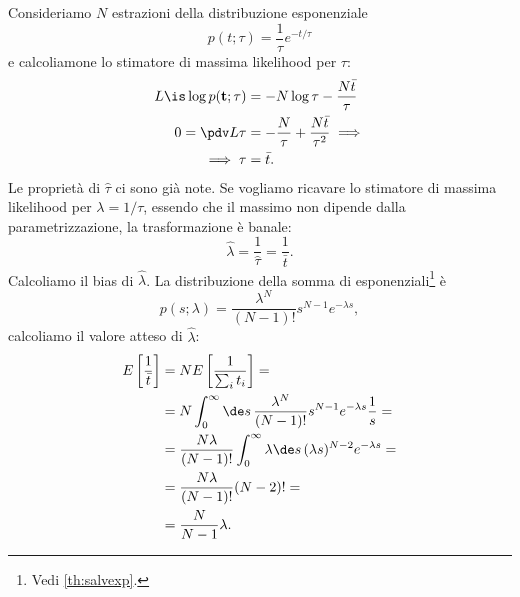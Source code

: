 
\begin{example}
	Consideriamo $N$ estrazioni della distribuzione esponenziale
	\begin{equation*}
		p(t;\tau)
		= \frac1\tau e^{-t/\tau}
	\end{equation*}
	e calcoliamone lo stimatore di massima likelihood per $\tau$:
	\begin{align*}
		L \is \log p(\mathbf t;\tau)
		&= -N\log\tau - \frac{N\bar t}\tau \\
		0 = \pdv L\tau
		&= -\frac N\tau + \frac{N\bar t}{\tau^2} \implies \\
		\implies \tau
		&= \bar t.
	\end{align*}
	Le proprietà di $\hat\tau$ ci sono già note.
	Se vogliamo ricavare lo stimatore di massima likelihood per $\lambda=1/\tau$,
	essendo che il massimo non dipende dalla parametrizzazione,
	la trasformazione è banale:
	\begin{equation*}
		\hat\lambda = \frac1{\hat\tau} = \frac1{\bar t}.
	\end{equation*}
	Calcoliamo il bias di $\hat\lambda$.
	La distribuzione della somma di esponenziali\footnote{Vedi \autoref{th:salvexp}.} è
	\begin{equation*}
		p(s;\lambda)
		= \frac{\lambda^N}{(N-1)!}s^{N-1}e^{-\lambda s},
	\end{equation*}
	calcoliamo il valore atteso di $\hat\lambda$:
	\begin{align*}
		E \left[\frac1{\bar t}\right]
		&= N E \left[\frac1{\sum_i t_i}\right] = \\
		&= N \int_0^\infty \de s\, \frac{\lambda^N}{(N-1)!}s^{N-1}e^{-\lambda s} \frac 1s = \\
		&= \frac{N\lambda}{(N-1)!} \int_0^\infty \lambda\de s\, (\lambda s)^{N-2} e^{-\lambda s} = \\
		&= \frac{N\lambda}{(N-1)!} (N-2)! = \\
		&= \frac N{N-1} \lambda.
	\end{align*}
\end{example}

